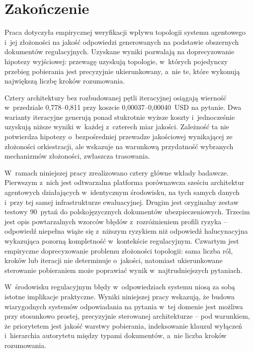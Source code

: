 \section{Zakończenie}\label{sec:zakonczenie}

Praca dotyczyła empirycznej weryfikacji wpływu topologii systemu agentowego
i~jej złożoności na jakość odpowiedzi generowanych na podstawie obszernych
dokumentów regulacyjnych. Uzyskane wyniki pozwalają na doprecyzowanie hipotezy
wyjściowej: przewagę uzyskują topologie, w~których pojedynczy przebieg
pobierania jest precyzyjnie ukierunkowany, a~nie te, które wykonują największą
liczbę kroków rozumowania.

Cztery architektury bez rozbudowanej pętli iteracyjnej osiągają wierność
w~przedziale 0{,}778--0{,}811 przy koszcie 0{,}00037--0{,}00040~USD na pytanie.
Dwa warianty iteracyjne generują ponad stukrotnie wyższe koszty i~jednocześnie
uzyskują niższe wyniki w~każdej z~czterech miar jakości. Zależność ta nie
potwierdza hipotezy o~bezpośredniej przewadze jakościowej wynikającej ze
złożoności orkiestracji, ale wskazuje na warunkową przydatność wybranych
mechanizmów złożoności, zwłaszcza trasowania.

W~ramach niniejszej pracy zrealizowano cztery główne wkłady badawcze. Pierwszym
z~nich jest odtwarzalna platforma porównawcza sześciu architektur agentowych
działających w~identycznym środowisku, na tych samych danych i~przy tej samej
infrastrukturze ewaluacyjnej. Drugim jest oryginalny zestaw testowy 90~pytań do
polskojęzycznych dokumentów ubezpieczeniowych. Trzecim jest opis powtarzalnych
wzorców błędów z~rozróżnieniem profili ryzyka -- odpowiedź niepełna wiąże się
z~niższym ryzykiem niż odpowiedź halucynacyjna wykazująca pozorną kompletność
w~kontekście regulacyjnym. Czwartym jest empiryczne doprecyzowanie problemu
złożoności topologii: sama liczba ról, kroków lub iteracji nie determinuje
o~jakości, natomiast ukierunkowane sterowanie pobieraniem może poprawiać wynik
w~najtrudniejszych pytaniach.

W~środowisku regulacyjnym błędy w~odpowiedziach systemu niosą za sobą istotne
implikacje praktyczne. Wyniki niniejszej pracy wskazują, że budowa wiarygodnych
systemów odpowiadania na pytania w~tej domenie jest możliwa przy stosunkowo
prostej, precyzyjnie sterowanej architekturze -- pod warunkiem, że priorytetem
jest jakość warstwy pobierania, indeksowanie klauzul wyłączeń i~hierarchia
autorytetu między typami dokumentów, a~nie liczba kroków rozumowania.